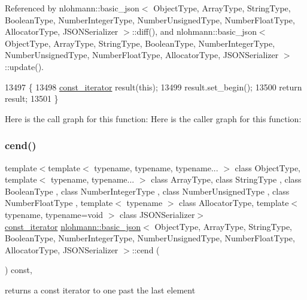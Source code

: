 Referenced by nlohmann\+::basic\+\_\+json$<$ Object\+Type, Array\+Type, String\+Type, Boolean\+Type, Number\+Integer\+Type, Number\+Unsigned\+Type, Number\+Float\+Type, Allocator\+Type, J\+S\+O\+N\+Serializer $>$\+::diff(), and nlohmann\+::basic\+\_\+json$<$ Object\+Type, Array\+Type, String\+Type, Boolean\+Type, Number\+Integer\+Type, Number\+Unsigned\+Type, Number\+Float\+Type, Allocator\+Type, J\+S\+O\+N\+Serializer $>$\+::update().


\begin{DoxyCode}
13497     \{
13498         \hyperlink{classnlohmann_1_1basic__json_a41a70cf9993951836d129bb1c2b3126a}{const\_iterator} result(\textcolor{keyword}{this});
13499         result.set\_begin();
13500         \textcolor{keywordflow}{return} result;
13501     \}
\end{DoxyCode}
Here is the call graph for this function\+:
Here is the caller graph for this function\+:
\mbox{\label{classnlohmann_1_1basic__json_a8dba7b7d2f38e6b0c614030aa43983f6}} 
\subsubsection{\texorpdfstring{cend()}{cend()}}
{\footnotesize\ttfamily template$<$template$<$ typename, typename, typename... $>$ class Object\+Type, template$<$ typename, typename... $>$ class Array\+Type, class String\+Type , class Boolean\+Type , class Number\+Integer\+Type , class Number\+Unsigned\+Type , class Number\+Float\+Type , template$<$ typename $>$ class Allocator\+Type, template$<$ typename, typename=void $>$ class J\+S\+O\+N\+Serializer$>$ \\
\hyperlink{classnlohmann_1_1basic__json_a41a70cf9993951836d129bb1c2b3126a}{const\+\_\+iterator} \hyperlink{classnlohmann_1_1basic__json}{nlohmann\+::basic\+\_\+json}$<$ Object\+Type, Array\+Type, String\+Type, Boolean\+Type, Number\+Integer\+Type, Number\+Unsigned\+Type, Number\+Float\+Type, Allocator\+Type, J\+S\+O\+N\+Serializer $>$\+::cend (\begin{DoxyParamCaption}{ }\end{DoxyParamCaption}) const\hspace{0.3cm}{\ttfamily [inline]}, {\ttfamily [noexcept]}}



returns a const iterator to one past the last element 

